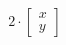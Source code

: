 \documentclass[preview]{standalone}
\begin{document}
\begin{align*}
2 \cdot \begin{bmatrix} x \\ y \end{bmatrix}
\end{align*}
\end{document}

